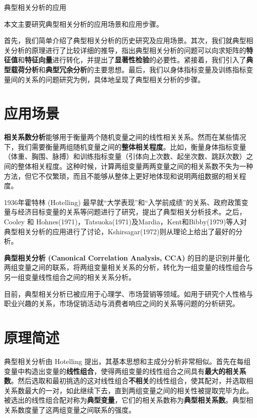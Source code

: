 \documentclass[withoutpreface]{cumcmthesis}
\begin{document}
\begin{abstractpage}{典型相关分析的应用}

    本文主要研究典型相关分析的应用场景和应用步骤。

    首先，我们简单介绍了典型相关分析的历史研究及应用场景。其次，我们就典型相关分析的原理进行了比较详细的推导，指出典型相关分析的问题可以向求矩阵的\textbf{特征值}和\textbf{特征向量}进行转化，并提出了\textbf{显著性检验}的必要性。紧接着，我们引入了\textbf{典型载荷分析}和\textbf{典型冗余分析}的主要思想。最后，我们以身体指标变量及训练指标变量间的关系的问题研究为例，具体地呈现了典型相关分析的步骤。


\end{abstractpage}

\tocpage 

\section{应用场景}
\textbf{相关系数分析}能够用于衡量两个随机变量之间的线性相关关系。然而在某些情况下，我们需要衡量两组随机变量之间的\textbf{整体相关程度}。比如，衡量身体指标变量（体重、胸围、脉搏）和训练指标变量（引体向上次数、起坐次数、跳跃次数）之间的整体相关程度。这种时候，计算两组变量两两变量之间的相关系数不失为一种方法，但它不仅繁琐，而且不能够从整体上更好地体现和说明两组数据的相关程度。

1936年霍特林 (Hotelling) 最早就“大学表现”和“入学前成绩”的关系、政府政策变量与经济目标变量的关系等问题进行了研究，提出了典型相关分析技术。之后，Cooley 和 Hohnes(1971)，Tatsuoka(1971)及Mardia，Kent和Bibby(1979)等人对典型相关分析的应用进行了讨论，Kshirsagar(1972)则从理论上给出了最好的分析。

\textbf{典型相关分析 (Canonical Correlation Analysis, CCA)} 的目的是识别并量化两组变量之间的联系，将两组变量相关关系的分析，转化为一组变量的线性组合与另一组变量线性组合之间的相关关系分析。

目前，典型相关分析已被应用于心理学、市场营销等领域。如用于研究个人性格与职业兴趣的关系，市场促销活动与消费者响应之间的关系等问题的分析研究。

\section{原理简述}
典型相关分析由 Hotelling 提出，其基本思想和主成分分析非常相似。首先在每组变量中构造出变量的\textbf{线性组合}，使得两组变量的线性组合之间具有\textbf{最大的相关系数}。然后选取和最初挑选的这对线性组合\textbf{不相关}的线性组合，使其配对，并选取相关系数最大的一对，如此继续下去，直到两组变量之间的相关性被提取完毕为此。被选出的线性组合配对称为\textbf{典型变量}，它们的相关系数称为\textbf{典型相关系数}。典型相关系数度量了这两组变量之间联系的强度。
\end{document}

